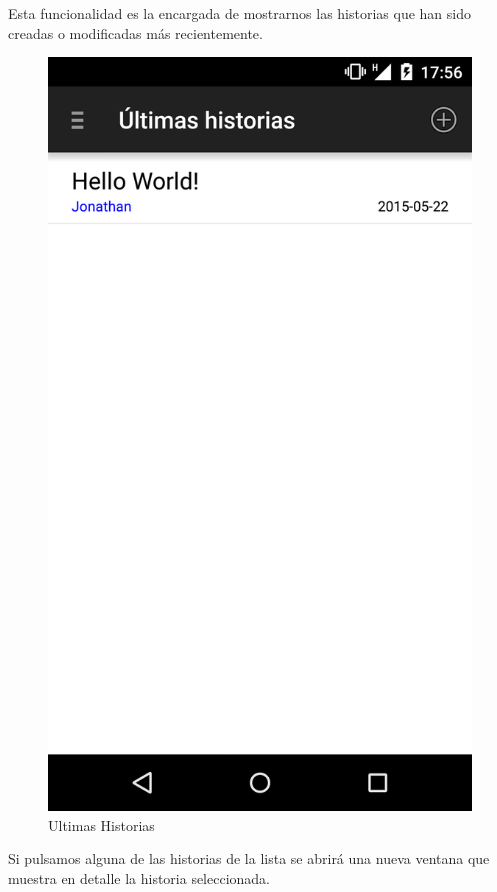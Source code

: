 \documentclass[11pt,a4paper, titlepage]{article}
\begin{document}
	Esta funcionalidad es la encargada de mostrarnos las historias que han sido creadas o modificadas más recientemente.
	
	\begin{figure}[hbtp]
		\centering
		\includegraphics[scale = 0.25 ]{img/4}
		\caption{Ultimas Historias}
		\label{p1}
	\end{figure}
	
	Si pulsamos alguna de las historias de la lista se abrirá una nueva ventana que muestra en detalle la historia seleccionada.
	
\end{document}

